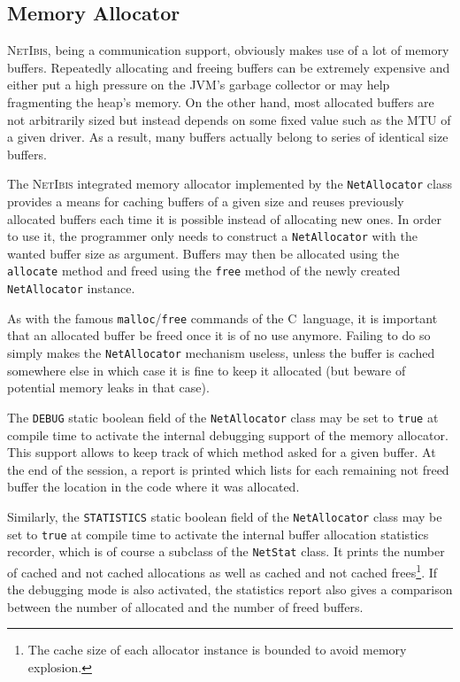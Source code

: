 \documentclass[11pt]{book}
\def\NetIbis{\textsc{NetIbis}\xspace}
\begin{document}
\subsection{Memory Allocator}
\label{sec:memory-allocator}

\NetIbis, being a communication support, obviously makes use of a lot
of memory buffers. Repeatedly allocating and freeing buffers can be
extremely expensive and either put a high pressure on the JVM's
garbage collector or may help fragmenting the heap's memory. On the
other hand, most allocated buffers are not arbitrarily sized but
instead depends on some fixed value such as the MTU of a given driver.
As a result, many buffers actually belong to series of identical size
buffers.

The \NetIbis integrated memory allocator implemented by the
\texttt{NetAllocator} class provides a means for caching buffers of
a given size and reuses previously allocated buffers each time it is
possible instead of allocating new ones. In order to use it, the
programmer only needs to construct a \texttt{NetAllocator} with the
wanted buffer size as argument. Buffers may then be allocated using
the \texttt{allocate} method and freed using the \texttt{free} method
of the newly created \texttt{NetAllocator} instance.

As with the famous \texttt{malloc}/\texttt{free} commands of the
C~language, it is important that an allocated buffer be freed once it
is of no use anymore. Failing to do so simply makes the
\texttt{NetAllocator} mechanism useless, unless the buffer is cached
somewhere else in which case it is fine to keep it allocated (but
beware of potential memory leaks in that case). 

The \texttt{DEBUG} static boolean field of the \texttt{NetAllocator}
class may be set to \texttt{true} at compile time to activate the
internal debugging support of the memory allocator. This support
allows to keep track of which method asked for a given buffer. At the
end of the session, a report is printed which lists for each remaining
not freed buffer the location in the code where it was allocated.

Similarly, the \texttt{STATISTICS} static boolean field of the
\texttt{NetAllocator} class may be set to \texttt{true} at compile
time to activate the internal buffer allocation statistics recorder,
which is of course a subclass of the \texttt{NetStat} class. It prints
the number of cached and not cached allocations as well as cached and
not cached frees\footnote{The cache size of each allocator instance is
  bounded to avoid memory explosion.}. If the debugging mode is also
activated, the statistics report also gives a comparison between the
number of allocated and the number of freed buffers.
\end{document}
